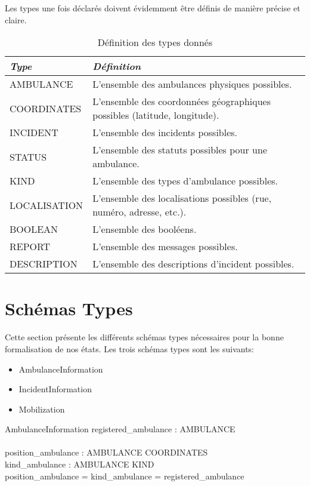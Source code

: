 \documentclass{report}
\begin{document}
Les types une fois déclarés doivent évidemment être définis de 
manière précise et claire. 
\begin{table}[!h]
\begin{minipage}{\marginparsep+\marginparwidth+\marginparpush+\textwidth}
	\begin{tabularx}{\textwidth}{|l|X|}
		\hline 
		\textit{Type} & \textit{Définition} \\
		\hline
		AMBULANCE & L'ensemble des ambulances physiques possibles. \\
		\hline
		COORDINATES & L'ensemble des coordonnées géographiques possibles (latitude, longitude). \\
		\hline
		INCIDENT & L'ensemble des incidents possibles. \\
		\hline
		STATUS & L'ensemble des statuts possibles pour une ambulance. \\
		\hline
		KIND & L'ensemble des types d'ambulance possibles. \\
		\hline
		LOCALISATION & L'ensemble des localisations possibles (rue, numéro, adresse, etc.). \\
		\hline
		BOOLEAN & L'ensemble des booléens. \\
		\hline
		REPORT & L'ensemble des messages possibles. \\
		\hline
		DESCRIPTION & L'ensemble des descriptions d'incident possibles. \\
		\hline
	\end{tabularx}
	\caption{Définition des types donnés}\label{tab:typedefinition}
\end{minipage}
\end{table}

\section{Schémas Types}\label{sec:sctype}
Cette section présente les différents schémas types nécessaires pour la 
bonne formalisation de nos états. Les trois schémas types sont 
les suivants: 
\begin{itemize}
	\item AmbulanceInformation
	\item IncidentInformation
	\item Mobilization
\end{itemize}

\begin{schema}{AmbulanceInformation}
 	registered\_ambulance : \power AMBULANCE \\
	\newline \\
 	position\_ambulance : AMBULANCE \pfun COORDINATES \\
 	kind\_ambulance : AMBULANCE \pfun KIND \\
  \where
  	\dom position\_ambulance = \dom kind\_ambulance = registered\_ambulance
\end{schema}
\end{document}
